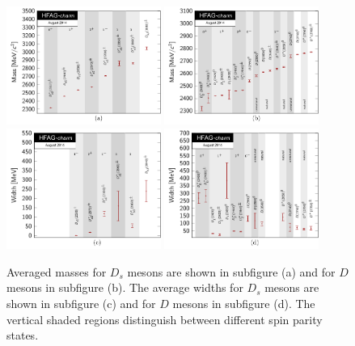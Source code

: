 \begin{figure}[htb!]
\begin{centering}
\includegraphics[width=0.45\textwidth]{./figures/charm/Dsmasses}
\quad
\includegraphics[width=0.45\textwidth]{./figures/charm/Dmasses}\\
\includegraphics[width=0.45\textwidth]{./figures/charm/Dswidths}
\quad
\includegraphics[width=0.45\textwidth]{./figures/charm/Dwidths}

\caption{\label{fig:charm:spect:1}  Averaged masses for $D_{s}$ mesons are shown in subfigure (a) and for $D$ mesons in subfigure (b). The average widths for $D_{s}$ mesons are shown in subfigure (c) and for $D$ mesons in subfigure (d). The vertical shaded regions distinguish between different spin parity states.}
\end{centering}
\end{figure}

